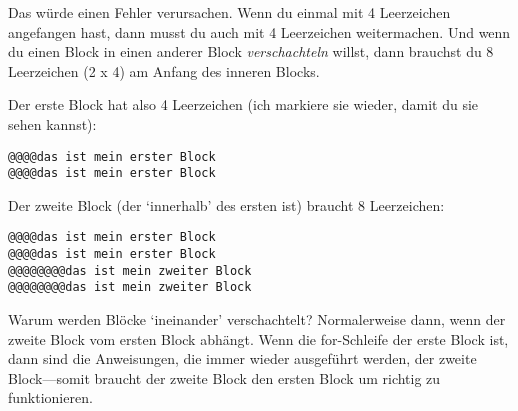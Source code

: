 Das würde einen Fehler verursachen. Wenn du einmal mit 4 Leerzeichen angefangen hast, dann musst du auch mit 4 Leerzeichen weitermachen. Und wenn du einen Block in einen anderer Block \emph{verschachteln} willst, dann brauchst du 8 Leerzeichen (2 x 4) am Anfang des inneren Blocks.
\par
Der erste Block hat also 4 Leerzeichen (ich markiere sie wieder, damit du sie sehen kannst):

\begin{listing}
\begin{verbatim}
@@@@das ist mein erster Block
@@@@das ist mein erster Block
\end{verbatim}
\end{listing}

Der zweite Block (der `innerhalb' des ersten ist) braucht 8 Leerzeichen:

\begin{listing}
\begin{verbatim}
@@@@das ist mein erster Block
@@@@das ist mein erster Block
@@@@@@@@das ist mein zweiter Block
@@@@@@@@das ist mein zweiter Block
\end{verbatim}
\end{listing}

Warum werden Blöcke `ineinander' verschachtelt? Normalerweise dann, wenn der zweite Block vom ersten Block abhängt. Wenn die for-Schleife der erste Block ist, dann sind die Anweisungen, die immer wieder ausgeführt werden, der zweite Block---somit braucht der zweite Block den ersten Block um richtig zu funktionieren.

